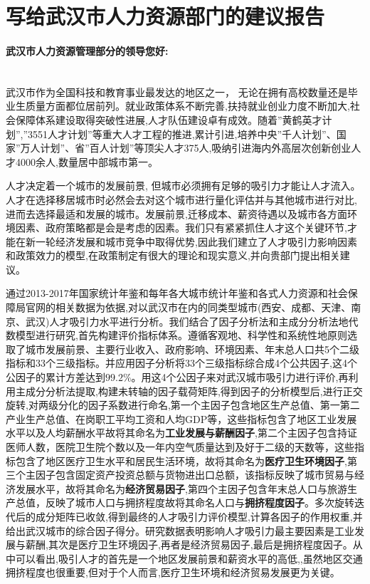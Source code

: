 \documentclass{whutmod}
\begin{document}
	\section{写给武汉市人力资源部门的建议报告}
	

	\paragraph{武汉市人力资源管理部分的领导您好:}
	~\\
	
	武汉市作为全国科技和教育事业最发达的地区之一， 无论在拥有高校数量还是毕业生质量方面都位居前列。就业政策体系不断完善,扶持就业创业力度不断加大,社会保障体系建设取得突破性进展,人才队伍建设卓有成效。随着”黄鹤英才计划”,”3551人才计划”等重大人才工程的推进,累计引进,培养中央”千人计划”、国家”万人计划”、省”百人计划”等顶尖人才375人,吸纳引进海内外高层次创新创业人才4000余人,数量居中部城市第一。
	
	人才决定着一个城市的发展前景, 但城市必须拥有足够的吸引力才能让人才流入。人才在选择移居城市时必然会去对这个城市进行量化评估并与其他城市进行对比, 进而去选择最适和发展的城市。发展前景,迁移成本、薪资待遇以及城市各方面环境因素、政府策略都是会是考虑的因素。我们只有紧紧抓住人才这个关键环节,才能在新一轮经济发展和城市竞争中取得优势,因此我们建立了人才吸引力影响因素和政策效力的模型,在政策制定有很大的理论和现实意义,并向贵部门提出相关建议。
	
	通过2013-2017年国家统计年鉴和每年各大城市统计年鉴和各式人力资源和社会保障局官网的相关数据为依据,对以武汉市在内的同类型城市(西安、成都、天津、南京、武汉)人才吸引力水平进行分析。我们结合了因子分析法和主成分分析法地代数模型进行研究,首先构建评价指标体系。遵循客观地、科学性和系统性地原则选取了城市发展前景、主要行业收入、政府影响、环境因素、年末总人口共5个二级指标和33个三级指标。并应用因子分析将33个三级指标综合成4个公共因子,这4个公因子的累计方差达到$99.2\%$。用这4个公因子来对武汉城市吸引力进行评价,再利用主成分分析法提取,构建未转轴的因子载荷矩阵,得到因子的分析模型后,进行正交旋转,对两级分化的因子系数进行命名,第一个主因子包含地区生产总值、第一第二产业生产总值、在岗职工平均工资和人均GDP等，这些指标包含了地区工业发展水平以及人均薪酬水平故将其命名为\textbf{工业发展与薪酬因子},第二个主因子包含持证医师人数，医院卫生院个数以及一年内空气质量达到及好于二级的天数等，这些指标包含了地区医疗卫生水平和居民生活环境，故将其命名为\textbf{医疗卫生环境因子},第三个主因子包含固定资产投资总额与货物进出口总额，该指标反映了城市贸易与经济发展水平，故将其命名为\textbf{经济贸易因子},第四个主因子包含年末总人口与旅游生产总值，反映了城市人口与拥挤程度故将其命名人口与\textbf{拥挤程度因子}。多次旋转迭代后的成分矩阵已收敛,得到最终的人才吸引力评价模型,计算各因子的作用权重,并给出武汉城市的综合因子得分。研究数据表明影响人才吸引力最主要因素是工业发展与薪酬,其次是医疗卫生环境因子,再者是经济贸易因子,最后是拥挤程度因子。从中可以看出,吸引人才的首先是一个地区发展前景和薪资水平的高低,,虽然地区交通拥挤程度也很重要,但对于个人而言,医疗卫生环境和经济贸易发展更为关键。
	
\end{document}
